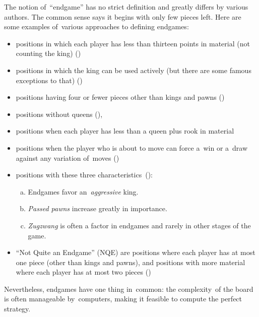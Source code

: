 The notion of~``endgame'' has no strict definition and greatly differs by various authors.
The common sense says it begins with only few pieces left.
Here are some examples of~various approaches to defining endgames:
\begin{itemize}
  \item
    positions in which each player has less than thirteen points in material (not counting the king)
    (\cite{Speelman1981endgame})
    
  \item
    positions in which the king can be used actively (but there are some famous exceptions to that)
    (\cite{Speelman1981endgame})
    
  \item
    positions having four or fewer pieces other than kings and pawns
    (\cite{Minev2004practical})
    
  \item
    positions without queens
    (\cite{Fine1952middle}),
    
  \item
    positions when each player has less than a queen plus rook in material
    
  \item
    positions when the player who is about to move can force a~win or a~draw against any variation of~moves
    (\cite{Portisch1981six})

  \item 
    positions with these three characteristics~(\cite{Alburt1999just}):

    \begin{enumerate}[(a)]
      \item Endgames favor an~\emph{aggressive} king.
      \item \emph{Passed pawns} increase greatly in importance.
      \item \emph{Zugzwang} is often a factor in endgames and rarely in other stages of the game.
    \end{enumerate}

  \item
    ``Not Quite an Endgame'' (NQE) are positions where each player has at most one piece (other than kings and pawns), and positions with more material where each player has at most two pieces
    (\cite{Flear2007practical})
\end{itemize}

Nevertheless, endgames have one thing in~common:
the complexity~of the board is often manageable by~computers, making it feasible to compute the perfect strategy.

